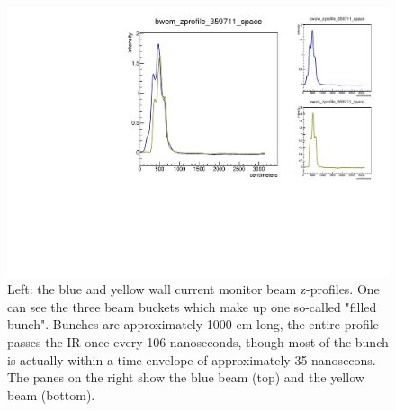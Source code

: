 \begin{figure}
\begin{center}
\includegraphics[width=\linewidth,height=\textheight,keepaspectratio]{./figures/359711_wcm_zprofile}
\caption{ 
Left: the blue and yellow wall current monitor beam z-profiles. One can see the
three beam buckets which make up one so-called "filled bunch". Bunches are
approximately 1000 cm long, the entire profile passes the IR once every 106
nanoseconds, though most of the bunch is actually within a time envelope of
approximately 35 nanosecons. The panes on the right show the blue beam (top)
and the yellow beam (bottom).
}
\label{fig:359711_wcm_zprofile}
\end{center}
\end{figure}
